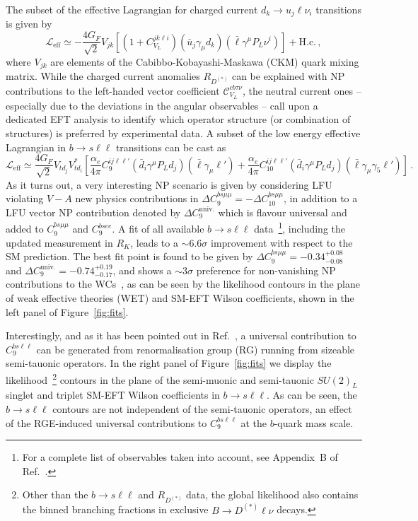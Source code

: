 \documentclass[a4paper,11pt]{article}
\def\bsll{b \to s\ell\ell}
\def\rdrds{R_{D^{(\ast)}}}
\def\rk{R_{K}}
\begin{document}
The subset of the effective Lagrangian for charged current $d_k\to u_j\ell\nu_i$ transitions is given by
\begin{equation}
    \mathcal L_{\mathrm{eff}} \simeq -\frac{4 G_F}{\sqrt{2}}V_{jk}\left[(1 + C_{V_L}^{jk\ell i})(\bar u_j \gamma_\mu d_k)(\bar \ell \gamma^\mu P_L \nu^i) \right] + \mathrm{H.c.}\,,
\end{equation}
where $V_{jk}$ are elements of the Cabibbo-Kobayashi-Maskawa (CKM) quark mixing matrix.
While the charged current anomalies $\rdrds$ can be explained with NP contributions to the left-handed vector coefficient $\mathcal C_{V_L}^{c b \tau \nu}$, the neutral current ones -- especially due to the deviations in the angular observables -- call upon a dedicated EFT analysis to identify which operator structure (or combination of structures) is 
preferred by experimental data.
A subset of the low energy effective Lagrangian in $\bsll$ transitions can be cast as
\begin{equation}
    \mathcal L_\mathrm{eff} \simeq \frac{4  G_F}{\sqrt{2}}V_{t d_j}V_{t d_i}^\ast\left[\frac{\alpha_e}{4\pi} C_9^{ij\ell\ell'}(\bar d_i\gamma^\mu P_L d_j)(\bar \ell \gamma_\mu \ell') + \frac{\alpha_e}{4\pi} C_{10}^{ij\ell\ell'}(\bar d_i\gamma^\mu P_L d_j)(\bar \ell \gamma_\mu\gamma_5 \ell')\right]\,.
\end{equation}
As it turns out, a very interesting NP scenario is given by considering LFU violating $V-A$ new physics contributions in $\Delta C_9^{bs\mu\mu} = - \Delta C_{10}^{bs\mu\mu}$, in addition to a LFU vector NP contribution denoted by $\Delta C_9^\mathrm{univ.}$ which is flavour universal and added to $C_9^{bs\mu\mu}$ and $C_9^{bsee}$. 
A fit of all available $\bsll$ data~\footnote{For a complete list of observables taken into account, see Appendix~B of Ref.~\cite{LQ2020}.}, including the updated measurement in $\rk$, leads to a $\sim 6.6 \sigma$ improvement with respect to the SM prediction. The best fit point is found to be given by $\Delta C_9^{bs\mu\mu} = -0.34^{+0.08}_{-0.08}$ and $\Delta C_9^\mathrm{univ.} = -0.74^{+0.19}_{-0.17}$, and shows a $\sim 3\sigma$ preference for non-vanishing NP contributions to the WCs~\cite{talk}, as can be seen by the likelihood contours 
in the plane of weak effective theories (WET) and SM-EFT Wilson coefficients, shown in the left panel of Figure~\ref{fig:fits}.

Interestingly, and as it has been pointed out in Ref.~\cite{Crivellin:2018yvo}, a universal contribution to $C_9^{bs\ell\ell}$ can be generated from renormalisation group (RG) running from sizeable semi-tauonic operators. 
In the right panel of 
Figure~\ref{fig:fits} we display the
likelihood~\footnote{Other than the $\bsll$ and $\rdrds$ data, the global likelihood also contains the binned branching fractions in exclusive $B\to D^{(\ast)}\ell\nu$ decays.}
contours in the plane of the semi-muonic and semi-tauonic $SU(2)_L$ singlet and triplet SM-EFT Wilson coefficients in $\bsll$. As can be seen, the $\bsll$ contours are not independent of the semi-tauonic operators, an effect of the RGE-induced universal contributions to $C_9^{bs\ell\ell}$ at the $b$-quark mass scale.
\end{document}

